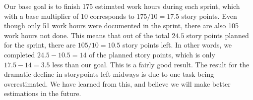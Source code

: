 Our base goal is to finish 175 estimated work hours during each sprint, which with a base multiplier of 10
corresponds to $175/10=17.5$ story points. Even though only 51 work hours were documented in the sprint, 
there are also 105 work hours not done. This means that out of the total $24.5$ story points planned 
for the sprint, there are $105/10=10.5$ story points left. In other words, we completed $24.5-10.5=14$ of 
the planned story points, which is only $17.5-14=3.5$ less than our goal. This is a fairly good result.
The result for the dramatic decline in storypoints left midways is due to one
task being overestimated. We have learned from this, and believe we will
make better estimations in the future.
